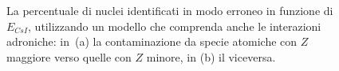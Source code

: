 \begin{figure}[!p] 
	\centering
	\hspace{10mm}
	\caption{La percentuale di nuclei identificati in modo erroneo in funzione di $E_{CsI}$, utilizzando un modello che comprenda anche le interazioni adroniche: in~(a) la contaminazione da specie atomiche con $Z$ maggiore verso quelle con $Z$ minore, in (b) il viceversa.} \label{fig:leakage_res_adron}
\end{figure}


\subsection{}

